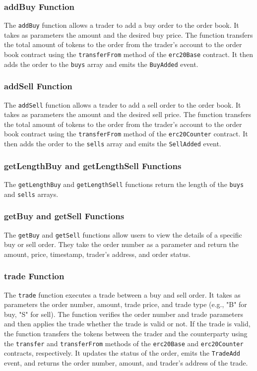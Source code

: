 \subsubsection{addBuy Function}


The \texttt{addBuy} function allows a trader to add a buy order to the order book. It takes as parameters the amount and the desired buy price.
The function transfers the total amount of tokens to the order from the trader's account  to the order book contract using the \texttt{transferFrom}
method of the \texttt{erc20Base} contract. It then adds the order to the \texttt{buys} array and emits the \texttt{BuyAdded} event.

\subsubsection{addSell Function}


The \texttt{addSell} function allows a trader to add a sell order to the order book. It takes as parameters the amount and the desired sell price.
The function transfers the total amount of tokens to the order from the trader's account  to the order book contract using the \texttt{transferFrom}
method of the \texttt{erc20Counter} contract. It then adds the order to the \texttt{sells} array and emits the \texttt{SellAdded} event.


\subsubsection{getLengthBuy and getLengthSell Functions}


The \texttt{getLengthBuy} and \texttt{getLengthSell} functions return the length of the \texttt{buys} and \texttt{sells} arrays.


\subsubsection{getBuy and getSell Functions}


The \texttt{getBuy} and \texttt{getSell} functions allow users to view the details of a specific buy or sell order. They take the order number as a parameter and return the amount, price, timestamp, trader's address, and order status.


\subsubsection{trade Function}


The \texttt{trade} function executes a trade between a buy and sell order. It takes as parameters the order number, amount, trade price, and trade type (e.g., "B" for buy, "S" for sell). The function verifies the order number and trade parameters and then applies the trade whether the trade is valid or not.
If the trade is valid, the function transfers the tokens between the trader and the counterparty using the \texttt{transfer} and \texttt{transferFrom} methods of the \texttt{erc20Base} and \texttt{erc20Counter} contracts, respectively. It updates the status of the order, emits the \texttt{TradeAdd} event, and returns
the order number, amount, and trader's address of the trade.


